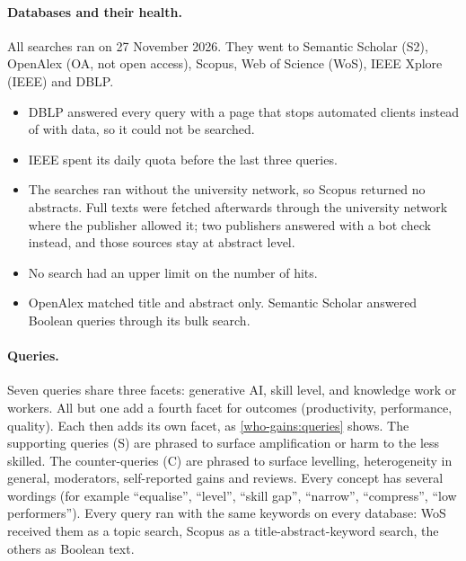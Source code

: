 \paragraph{Databases and their health.}
All searches ran on 27 November 2026. They went to Semantic Scholar
(S2), OpenAlex (OA, not open access), Scopus, Web of Science (WoS),
IEEE Xplore (IEEE) and DBLP.
\begin{itemize}
\item DBLP answered every query with a page that stops automated clients
  instead of with data, so it could not be searched.
\item IEEE spent its daily quota before the last three queries.
\item The searches ran without the university network, so Scopus
  returned no abstracts. Full texts were fetched afterwards through the
  university network where the publisher allowed it; two publishers
  answered with a bot check instead, and those sources stay at abstract
  level.
\item No search had an upper limit on the number of hits.
\item OpenAlex matched title and abstract only. Semantic Scholar answered
  Boolean queries through its bulk search.
\end{itemize}

\paragraph{Queries.}
Seven queries share three facets: generative AI, skill level, and
knowledge work or workers. All but one add a fourth facet for outcomes
(productivity, performance, quality). Each then adds its own facet, as
\cref{who-gains:queries} shows. The supporting queries (S) are phrased
to surface amplification or harm to the less skilled. The counter-queries
(C) are phrased to surface levelling, heterogeneity in general,
moderators, self-reported gains and reviews. Every concept has several
wordings (for example \enquote{equalise}, \enquote{level},
\enquote{skill gap}, \enquote{narrow}, \enquote{compress}, \enquote{low
performers}). Every query ran with the same keywords on every database:
WoS received them as a topic search, Scopus as a title-abstract-keyword
search, the others as Boolean text.

